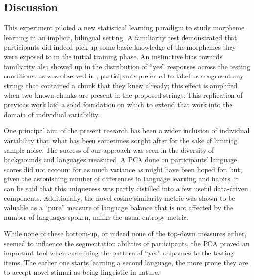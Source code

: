 \subsection{Discussion}
\label{Discussion1}
\setlength{\parindent}{20pt}
\justifying

\noindent
This experiment piloted a new statistical learning paradigm to study morpheme learning in an implicit, bilingual setting. A familiarity test demonstrated that participants did indeed pick up some basic knowledge of the morphemes they were exposed to in the initial training phase. An instinctive bias towards familiarity also showed up in the distribution of ``yes'' responses across the testing conditions: as was observed in \textcite{Lelonkiewicz2020}, participants preferred to label as congruent any strings that contained a chunk that they knew already; this effect is amplified when two known chunks are present in the proposed strings. This replication of previous work laid a solid foundation on which to extend that work into the domain of individual variability.

One principal aim of the present research has been a wider inclusion of individual variability than what has been sometimes sought after for the sake of limiting sample noise. The success of our approach was seen in the diversity of backgrounds and languages measured. A PCA done on participants' language scores did not account for as much variance as might have been hoped for, but, given the astonishing number of differences in language learning and habits, it can be said that this uniqueness was partly distilled into a few useful data-driven components. Additionally, the novel cosine similarity metric was shown to be valuable as a ``pure'' measure of language balance that is not affected by the number of languages spoken, unlike the usual entropy metric.

While none of these bottom-up, or indeed none of the top-down measures either, seemed to influence the segmentation abilities of participants, the PCA proved an important tool when examining the pattern of ``yes'' responses to the testing items. The earlier one starts learning a second language, the more prone they are to accept novel stimuli as being linguistic in nature. 

